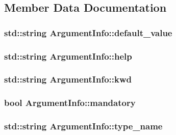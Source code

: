 \subsection{Member Data Documentation}
\hypertarget{structArgumentInfo_ab52fb72ba449c72671adedcaed9f5869}{
\subsubsection[{default\-\_\-value}]{\setlength{\rightskip}{0pt plus 5cm}std\-::string Argument\-Info\-::default\-\_\-value}}\label{structArgumentInfo_ab52fb72ba449c72671adedcaed9f5869}
\hypertarget{structArgumentInfo_addf894afc368f4443db54b6eb4a34780}{
\subsubsection[{help}]{\setlength{\rightskip}{0pt plus 5cm}std\-::string Argument\-Info\-::help}}\label{structArgumentInfo_addf894afc368f4443db54b6eb4a34780}
\hypertarget{structArgumentInfo_a3939ba50571353511e65445f7221ef7f}{
\subsubsection[{kwd}]{\setlength{\rightskip}{0pt plus 5cm}std\-::string Argument\-Info\-::kwd}}\label{structArgumentInfo_a3939ba50571353511e65445f7221ef7f}
\hypertarget{structArgumentInfo_adda4b808e8743cd88fc051a580a0ea90}{
\subsubsection[{mandatory}]{\setlength{\rightskip}{0pt plus 5cm}bool Argument\-Info\-::mandatory}}\label{structArgumentInfo_adda4b808e8743cd88fc051a580a0ea90}
\hypertarget{structArgumentInfo_a7b2bc9ef5d0e990148bbac47f1af412b}{
\subsubsection[{type\-\_\-name}]{\setlength{\rightskip}{0pt plus 5cm}std\-::string Argument\-Info\-::type\-\_\-name}}\label{structArgumentInfo_a7b2bc9ef5d0e990148bbac47f1af412b}
